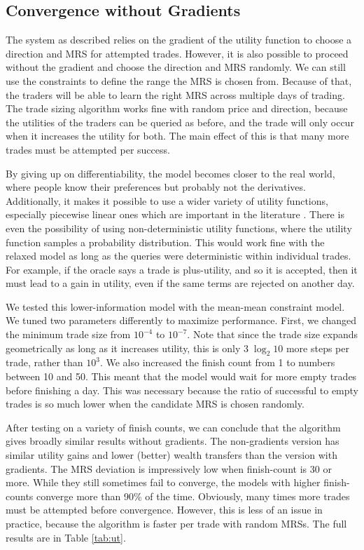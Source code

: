 \documentclass[12pt,a4paper,titlepage]{article}
\newcommand{\co}[1]{\textsf{#1}}
\begin{document}
\subsection{Convergence without Gradients}\label{nograd}
The system as described relies on the gradient of the utility function to choose a direction and MRS for attempted trades.
However, it is also possible to proceed without the gradient and choose the direction and MRS randomly.
We can still use the constraints to define the range the MRS is chosen from.
Because of that, the traders will be able to learn the right MRS across multiple days of trading.
The trade sizing algorithm works fine with random price and direction, because the utilities of the traders can be queried as before, and the trade will only occur when it increases the utility for both.
The main effect of this is that many more trades must be attempted per success.

By giving up on differentiability, the model becomes closer to the real world, where people know their preferences but probably not the derivatives.
Additionally, it makes it possible to use a wider variety of utility functions, especially piecewise linear ones which are important in the literature \cite{chen}.
There is even the possibility of using non-deterministic utility functions, where the utility function samples a probability distribution.
This would work fine with the relaxed model as long as the queries were deterministic within individual trades.
For example, if the oracle says a trade is plus-utility, and so it is accepted, then it must lead to a gain in utility, even if the same terms are rejected on another day.

We tested this lower-information model with the \co{mean}-\co{mean} constraint model.
We tuned two parameters differently to maximize performance. 
First, we changed the minimum trade size from $10^{-4}$ to $10^{-7}$.
Note that since the trade size expands geometrically as long as it increases utility, this is only $3 \; \log_2 10$ more steps per trade, rather than $10^3$.
We also increased the finish count from 1 to numbers between 10 and 50.
This meant that the model would wait for more empty trades before finishing a day.
This was necessary because the ratio of successful to empty trades is so much lower when the candidate MRS is chosen randomly.

After testing on a variety of finish counts, we can conclude that the algorithm gives broadly similar results without gradients. 
The non-gradients version has similar utility gains and lower (better) wealth transfers than the version with gradients.
The MRS deviation is impressively low when finish-count is 30 or more.
While they still sometimes fail to converge, the models with higher finish-counts converge more than 90\% of the time.
Obviously, many times more trades must be attempted before convergence.
However, this is less of an issue in practice, because the algorithm is faster per trade with random MRSs.
The full results are in Table \ref{tab:ut}.
\end{document}
